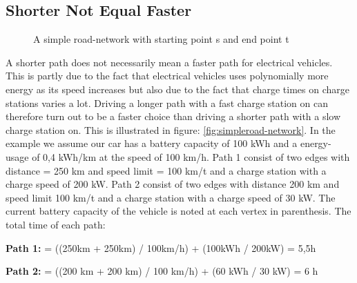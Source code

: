 \subsection{Shorter Not Equal Faster}

\begin{figure}
\label{figure:simpleroad-network}
\caption{A simple road-network with starting point s and end point t}
\end{figure}

A shorter path does not necessarily mean a faster path for electrical vehicles. 
This is partly due to the fact that electrical vehicles uses polynomially more energy as its speed increases but also due to the fact that charge times on charge stations varies a lot. 
Driving a longer path with a fast charge station on can therefore turn out to be a faster choice than driving a shorter path with a slow charge station on. 
This is illustrated in figure: \ref{fig:simpleroad-network}. In the example we assume our car has a battery capacity of 100 kWh and a energy-usage of 0,4 kWh/km at the speed of 100 km/h. Path 1 consist of two edges with distance = 250 km and speed limit = 100 km/t
and a charge station with a charge speed of 200 kW. Path 2 consist of two edges with
distance 200 km and speed limit 100 km/t and a charge station with a charge speed of 30 kW. The current battery capacity of the vehicle is noted at each vertex in parenthesis. The total time of each path:
				
\textbf{Path 1:}  = ((250km + 250km) / 100km/h) + (100kWh / 200kW) = 5,5h
				
\textbf{Path 2:}  = ((200 km + 200 km) / 100 km/h) + (60 kWh / 30 kW) = 6 h